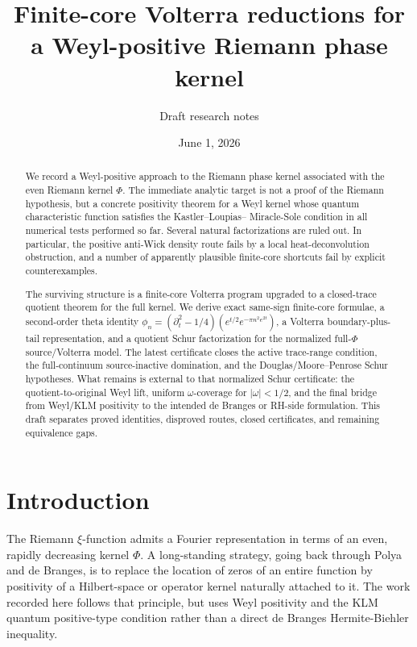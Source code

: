 \documentclass[11pt]{article}
\title{Finite-core Volterra reductions for a Weyl-positive Riemann phase kernel}
\author{Draft research notes}
\date{June 1, 2026}
\begin{document}
\maketitle

\begin{abstract}
We record a Weyl-positive approach to the Riemann phase kernel associated with
the even Riemann kernel $\Phi$.  The immediate analytic target is not a proof
of the Riemann hypothesis, but a concrete positivity theorem for a Weyl kernel
whose quantum characteristic function satisfies the Kastler--Loupias--
Miracle-Sole condition in all numerical tests performed so far.  Several
natural factorizations are ruled out.  In particular, the positive anti-Wick
density route fails by a local heat-deconvolution obstruction, and a number of
apparently plausible finite-core shortcuts fail by explicit counterexamples.

The surviving structure is a finite-core Volterra program upgraded to a
closed-trace quotient theorem for the full kernel.  We derive exact same-sign
finite-core formulae, a second-order theta identity
$\phi_n=(\partial_t^2-1/4)(e^{t/2}e^{-\pi n^2e^{2t}})$, a Volterra
boundary-plus-tail representation, and a quotient Schur factorization for the
normalized full-\(\Phi\) source/Volterra model.  The latest certificate closes
the active trace-range condition, the full-continuum source-inactive
domination, and the Douglas/Moore--Penrose Schur hypotheses.  What remains is
external to that normalized Schur certificate: the quotient-to-original Weyl
lift, uniform \(\omega\)-coverage for \(|\omega|<1/2\), and the final bridge
from Weyl/KLM positivity to the intended de Branges or RH-side formulation.
This draft separates proved identities, disproved routes, closed certificates,
and remaining equivalence gaps.
\end{abstract}

\tableofcontents

\section{Introduction}

The Riemann $\xi$-function admits a Fourier representation in terms of an even,
rapidly decreasing kernel $\Phi$.  A long-standing strategy, going back through
Polya and de Branges, is to replace the location of zeros of an entire function
by positivity of a Hilbert-space or operator kernel naturally attached to it.
The work recorded here follows that principle, but uses Weyl positivity and
the KLM quantum positive-type condition rather than a direct de Branges
Hermite-Biehler inequality.
\end{document}
